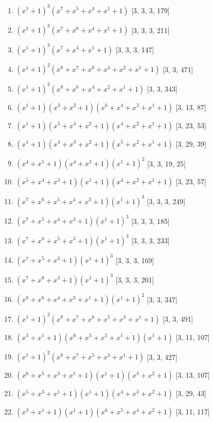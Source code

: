 \documentclass[10pt,twocolumn]{article}
\begin{document}
\begin{enumerate}
\item $(x^{1} + 1)^{3}(x^{7} + x^{5} + x^{4} + x^{1} + 1)$  [3, 3, 3, 179]
\item $(x^{1} + 1)^{3}(x^{7} + x^{6} + x^{4} + x^{1} + 1)$  [3, 3, 3, 211]
\item $(x^{1} + 1)^{3}(x^{7} + x^{4} + x^{1} + 1)$  [3, 3, 3, 147]
\item $(x^{1} + 1)^{2}(x^{8} + x^{7} + x^{6} + x^{4} + x^{2} + x^{1} + 1)$  [3, 3, 471]
\item $(x^{1} + 1)^{2}(x^{8} + x^{6} + x^{4} + x^{2} + x^{1} + 1)$  [3, 3, 343]
\item $(x^{1} + 1)(x^{3} + x^{2} + 1)(x^{6} + x^{4} + x^{2} + x^{1} + 1)$  [3, 13, 87]
\item $(x^{1} + 1)(x^{5} + x^{4} + x^{2} + 1)(x^{4} + x^{2} + x^{1} + 1)$  [3, 23, 53]
\item $(x^{1} + 1)(x^{4} + x^{3} + x^{2} + 1)(x^{5} + x^{2} + x^{1} + 1)$  [3, 29, 39]
\item $(x^{4} + x^{1} + 1)(x^{4} + x^{3} + 1)(x^{1} + 1)^{2}$  [3, 3, 19, 25]
\item $(x^{5} + x^{4} + x^{3} + 1)(x^{1} + 1)(x^{4} + x^{2} + x^{1} + 1)$  [3, 23, 57]
\item $(x^{7} + x^{6} + x^{5} + x^{4} + x^{3} + 1)(x^{1} + 1)^{3}$  [3, 3, 3, 249]
\item $(x^{7} + x^{5} + x^{4} + x^{3} + 1)(x^{1} + 1)^{3}$  [3, 3, 3, 185]
\item $(x^{7} + x^{6} + x^{5} + x^{3} + 1)(x^{1} + 1)^{3}$  [3, 3, 3, 233]
\item $(x^{7} + x^{5} + x^{3} + 1)(x^{1} + 1)^{3}$  [3, 3, 3, 169]
\item $(x^{7} + x^{6} + x^{3} + 1)(x^{1} + 1)^{3}$  [3, 3, 3, 201]
\item $(x^{8} + x^{6} + x^{4} + x^{3} + x^{1} + 1)(x^{1} + 1)^{2}$  [3, 3, 347]
\item $(x^{1} + 1)^{2}(x^{8} + x^{7} + x^{6} + x^{5} + x^{3} + x^{1} + 1)$  [3, 3, 491]
\item $(x^{3} + x^{1} + 1)(x^{6} + x^{5} + x^{3} + x^{1} + 1)(x^{1} + 1)$  [3, 11, 107]
\item $(x^{1} + 1)^{2}(x^{8} + x^{7} + x^{5} + x^{3} + x^{1} + 1)$  [3, 3, 427]
\item $(x^{6} + x^{5} + x^{3} + x^{1} + 1)(x^{1} + 1)(x^{3} + x^{2} + 1)$  [3, 13, 107]
\item $(x^{5} + x^{3} + x^{1} + 1)(x^{1} + 1)(x^{4} + x^{3} + x^{2} + 1)$  [3, 29, 43]
\item $(x^{3} + x^{1} + 1)(x^{1} + 1)(x^{6} + x^{5} + x^{4} + x^{2} + 1)$  [3, 11, 117]

\end{enumerate}
\end{document}
